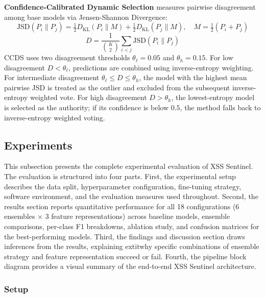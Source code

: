 \documentclass[11pt,a4paper]{article}
\begin{document}
\textbf{Confidence-Calibrated Dynamic Selection} measures pairwise
disagreement among base models via Jensen-Shannon Divergence:
\begin{equation}
  \text{JSD}(P_i\|P_j) = \tfrac{1}{2}D_{\text{KL}}(P_i\|M)+\tfrac{1}{2}D_{\text{KL}}(P_j\|M), \quad M = \tfrac{1}{2}(P_i+P_j)
  \label{eq:jsd}
\end{equation}
\begin{equation}
  D = \frac{1}{\binom{K}{2}}\sum_{i<j}\text{JSD}(P_i\|P_j)
  \label{eq:ccds_D}
\end{equation}
CCDS uses two disagreement thresholds $\theta_\ell{=}0.05$ and $\theta_h{=}0.15$.
For low disagreement $D < \theta_\ell$, predictions are combined using inverse-entropy weighting. 
For intermediate disagreement $\theta_\ell \leq D \leq \theta_h$, the model with the highest mean pairwise JSD is treated as the outlier and excluded from the subsequent inverse-entropy weighted vote. 
For high disagreement $D > \theta_h$, the lowest-entropy model is selected as the authority; if its confidence is below $0.5$, the method falls back to inverse-entropy weighted voting.

\subsection{Experiments}
\label{ssec:experiments}

This subsection presents the complete experimental evaluation of XSS Sentinel. The evaluation is
structured into four parts. First, the experimental setup describes the data split, hyperparameter
configuration, fine-tuning strategy, software environment, and the evaluation measures used throughout.
Second, the results section reports quantitative performance for all 18 configurations (6 ensembles
$\times$ 3 feature representations) across baseline models, ensemble comparisons, per-class F1
breakdowns, ablation study, and confusion matrices for the best-performing models. Third, the findings
and discussion section draws inferences from the results, explaining 	extit{why} specific
combinations of ensemble strategy and feature representation succeed or fail. Fourth, the pipeline
block diagram provides a visual summary of the end-to-end XSS Sentinel architecture.

\subsubsection{Setup}
\end{document}
